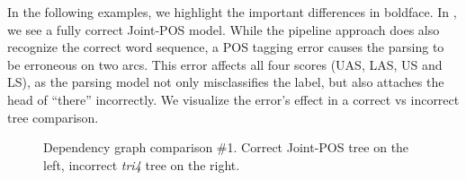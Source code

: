 \documentclass[11pt,letterpaper]{article}
\begin{document}
In the following examples, we highlight the important differences in boldface. In , we see a fully correct Joint-POS model. While the pipeline approach does also recognize the correct word sequence, a POS tagging error causes the parsing to be erroneous on two arcs. This error affects all four scores (UAS, LAS, US and LS), as the parsing model not only misclassifies the label, but also attaches the head of ``there'' incorrectly. We visualize the error's effect in a correct vs incorrect tree comparison.
\begin{figure}[h]
    \centering
    \caption{Dependency graph comparison \#1. Correct Joint-POS tree on the left, incorrect \emph{tri4} tree on the right.}%
    \label{fpx1}%
\end{figure}
\end{document}

